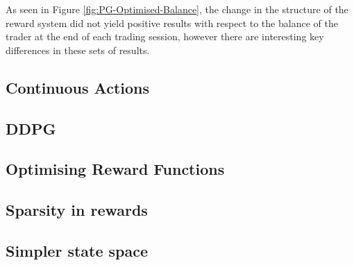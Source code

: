 \documentclass[ %
                    author={Ashwinder Khurana},
                supervisor={Prof Dave Cliff},
                    degree={MEng},
                     title={The Deeply Reinforced Trader},
                  subtitle={},
                      type={enterprise},
                      year={2020} ]{dissertation}
\begin{document}
{As seen in Figure \ref{fig:PG-Optimised-Balance}, the change in the structure of the reward system did not yield positive results with respect to the balance of the trader at the end of each trading session, however there are interesting key differences in these sets of results.  

















\subsection{Continuous Actions}
\subsection{DDPG}
\subsection{Optimising Reward Functions}
\subsection{Sparsity in rewards}
\subsection{Simpler state space}


}
\end{document}
